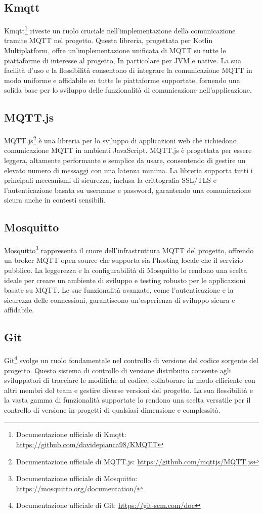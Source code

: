 \documentclass[12pt,a4paper,openright,twoside]{book}
\begin{document}
\subsection{Kmqtt}
Kmqtt\footnote{
    Documentazione ufficiale di Kmqtt: \url{https://github.com/davidepianca98/KMQTT} 
} riveste un ruolo cruciale nell'implementazione della comunicazione tramite \ac{MQTT} nel progetto. Questa libreria, progettata per Kotlin Multiplatform, offre 
un'implementazione unificata di \ac{MQTT} su tutte le piattaforme di interesse al progetto, In particolare per \ac{JVM} e native. La sua facilità d'uso e la flessibilità consentono di integrare la comunicazione 
\ac{MQTT} in modo uniforme e affidabile su tutte le piattaforme supportate, fornendo una solida base per lo sviluppo delle funzionalità di comunicazione nell'applicazione.

\subsection{MQTT.js}
MQTT.js\footnote{
    Documentazione ufficiale di MQTT.js: \url{https://github.com/mqttjs/MQTT.js} 
} è una libreria per lo sviluppo di applicazioni web che richiedono comunicazione \ac{MQTT} in ambienti JavaScript. 
MQTT.js è progettata per essere leggera, altamente performante e semplice da usare, consentendo di gestire un elevato numero di messaggi con una latenza minima. 
La libreria supporta tutti i principali meccanismi di sicurezza, inclusa la crittografia SSL/TLS e l'autenticazione basata su username e password, garantendo una comunicazione 
sicura anche in contesti sensibili.

\subsection{Mosquitto}
Mosquitto\footnote{
    Documentazione ufficiale di Mosquitto: \url{https://mosquitto.org/documentation/}
} rappresenta il cuore dell'infrastruttura \ac{MQTT} del progetto, offrendo un broker \ac{MQTT} open source che supporta sia l'hosting locale che il servizio pubblico. 
La leggerezza e la configurabilità di Mosquitto lo rendono una scelta ideale per creare un ambiente di sviluppo e testing robusto per le applicazioni basate su \ac{MQTT}. 
Le sue funzionalità avanzate, come l'autenticazione e la sicurezza delle connessioni, garantiscono un'esperienza di sviluppo sicura e affidabile.

\subsection{Git}
Git\footnote{
    Documentazione ufficiale di Git: \url{https://git-scm.com/doc}
} svolge un ruolo fondamentale nel controllo di versione del codice sorgente del progetto. Questo sistema di controllo di versione distribuito consente agli sviluppatori 
di tracciare le modifiche al codice, collaborare in modo efficiente con altri membri del team e gestire diverse versioni del progetto. La sua flessibilità e la vasta gamma 
di funzionalità supportate lo rendono una scelta versatile per il controllo di versione in progetti di qualsiasi dimensione e complessità.
\end{document}
